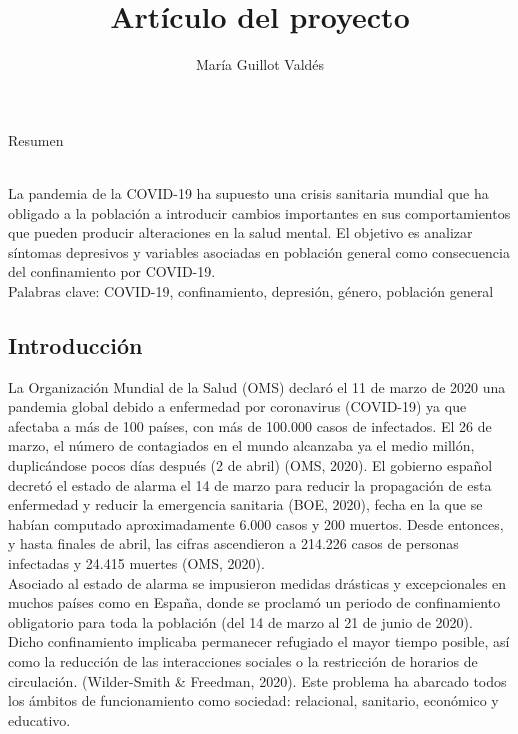 \documentclass[a4paper,11pt]{article}
\begin{document}
\title{Artículo del proyecto}
\author{María Guillot Valdés}
\maketitle
\begin{center}
Resumen
\begin{center}
\begin{flushleft}
\\La pandemia de la COVID-19 ha supuesto una crisis sanitaria mundial que ha obligado a la población a introducir cambios importantes en sus comportamientos que pueden producir alteraciones en la salud mental. El objetivo es analizar síntomas depresivos y variables asociadas en población general como consecuencia del confinamiento por COVID-19.\\Palabras clave: COVID-19, confinamiento, depresión,  género, población general
\begin{flushleft}
\part{Introducción}
\begin{flushleft}
La Organización Mundial de la Salud (OMS) declaró el 11 de marzo de 2020 una pandemia global debido a enfermedad por coronavirus (COVID-19) ya que afectaba a más de 100 países, con más de 100.000 casos de infectados. El 26 de marzo, el número de contagiados en el mundo alcanzaba ya el medio millón, duplicándose pocos días después (2 de abril) (OMS, 2020). El gobierno español decretó el estado de alarma el 14 de marzo para reducir la propagación de esta enfermedad y reducir la emergencia sanitaria (BOE, 2020), fecha en la que se habían computado aproximadamente 6.000 casos y 200 muertos. Desde entonces, y hasta finales de abril, las cifras ascendieron a 214.226 casos de personas infectadas y 24.415 muertes (OMS, 2020). \\
Asociado al estado de alarma se impusieron medidas drásticas y excepcionales en muchos países como en España, donde se proclamó un periodo de confinamiento obligatorio para toda la población (del 14 de marzo al 21 de junio de 2020). Dicho confinamiento implicaba permanecer refugiado el mayor tiempo posible,  así como la reducción de las interacciones sociales o la restricción de horarios de circulación. (Wilder-Smith & Freedman, 2020). Este problema ha abarcado todos los ámbitos de funcionamiento como sociedad: relacional, sanitario, económico y  educativo. 

\end{flushleft}
\end{flushleft}
\end{flushleft}
\end{center}
\end{center}
\end{document}

